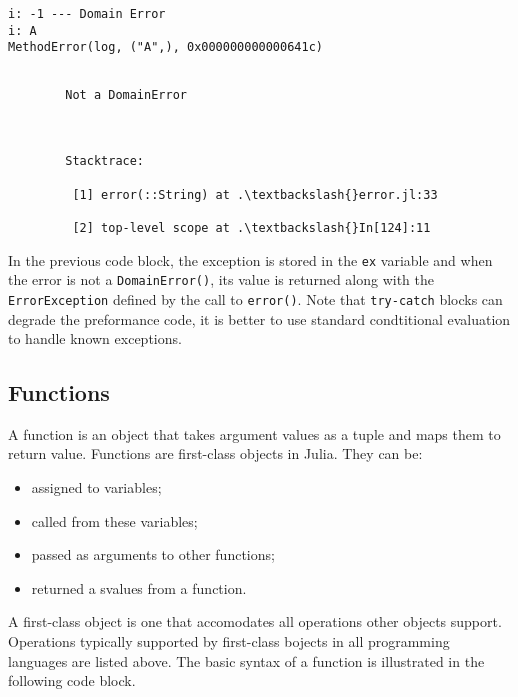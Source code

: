 \documentclass[11pt]{article}
\providecommand{\tightlist}{%
      \setlength{\itemsep}{0pt}\setlength{\parskip}{0pt}}
\begin{document}
    \begin{Verbatim}[commandchars=\\\{\}]
i: -1 --- Domain Error
i: A
MethodError(log, ("A",), 0x000000000000641c)

    \end{Verbatim}

    \begin{Verbatim}[commandchars=\\\{\}]

        Not a DomainError

        

        Stacktrace:

         [1] error(::String) at .\textbackslash{}error.jl:33

         [2] top-level scope at .\textbackslash{}In[124]:11

    \end{Verbatim}

    In the previous code block, the exception is stored in the \texttt{ex}
variable and when the error is not a \texttt{DomainError()}, its value
is returned along with the \texttt{ErrorException} defined by the call
to \texttt{error()}. Note that \texttt{try-catch} blocks can degrade the
preformance code, it is better to use standard condtitional evaluation
to handle known exceptions.

    \subsection{Functions}\label{functions}

A function is an object that takes argument values as a tuple and maps
them to return value. Functions are first-class objects in Julia. They
can be:

\begin{itemize}
\tightlist
\item
  assigned to variables;
\item
  called from these variables;
\item
  passed as arguments to other functions;
\item
  returned a svalues from a function.
\end{itemize}

A first-class object is one that accomodates all operations other
objects support. Operations typically supported by first-class bojects
in all programming languages are listed above. The basic syntax of a
function is illustrated in the following code block.
\end{document}
